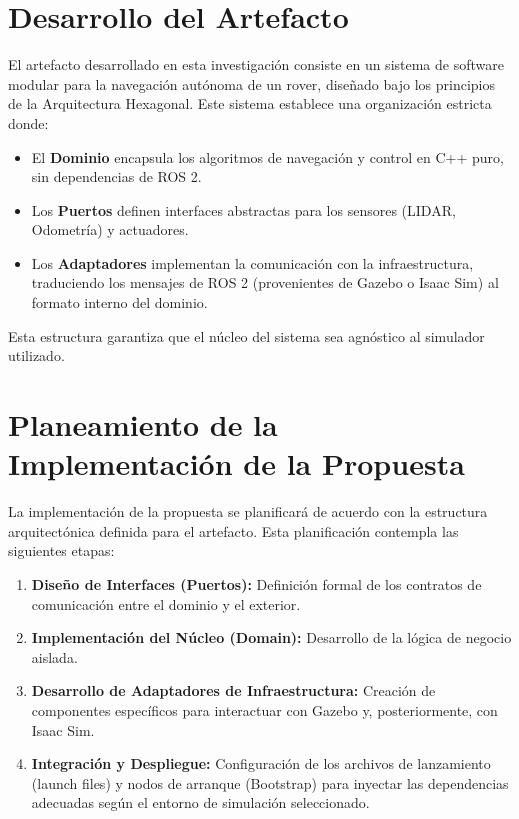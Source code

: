 \section{Desarrollo del Artefacto}

El artefacto desarrollado en esta investigación consiste en un sistema de software modular para la navegación autónoma de un rover, diseñado bajo los principios de la Arquitectura Hexagonal. Este sistema establece una organización estricta donde:
\begin{itemize}
    \item El \textbf{Dominio} encapsula los algoritmos de navegación y control en C++ puro, sin dependencias de ROS 2.
    \item Los \textbf{Puertos} definen interfaces abstractas para los sensores (LIDAR, Odometría) y actuadores.
    \item Los \textbf{Adaptadores} implementan la comunicación con la infraestructura, traduciendo los mensajes de ROS 2 (provenientes de Gazebo o Isaac Sim) al formato interno del dominio.
\end{itemize}
Esta estructura garantiza que el núcleo del sistema sea agnóstico al simulador utilizado.

\section{Planeamiento de la Implementación de la Propuesta}

La implementación de la propuesta se planificará de acuerdo con la estructura arquitectónica definida para el artefacto. Esta planificación contempla las siguientes etapas:
\begin{enumerate}
    \item \textbf{Diseño de Interfaces (Puertos):} Definición formal de los contratos de comunicación entre el dominio y el exterior.
    \item \textbf{Implementación del Núcleo (Domain):} Desarrollo de la lógica de negocio aislada.
    \item \textbf{Desarrollo de Adaptadores de Infraestructura:} Creación de componentes específicos para interactuar con Gazebo y, posteriormente, con Isaac Sim.
    \item \textbf{Integración y Despliegue:} Configuración de los archivos de lanzamiento (launch files) y nodos de arranque (Bootstrap) para inyectar las dependencias adecuadas según el entorno de simulación seleccionado.
\end{enumerate}

